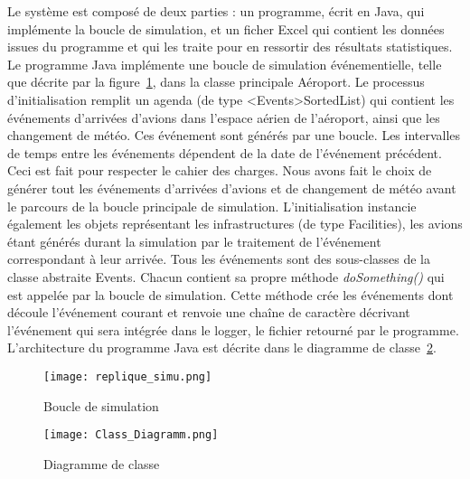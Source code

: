 


Le système est composé de deux parties : un programme, écrit en Java,  qui implémente la boucle de simulation, et un ficher Excel qui contient les données issues du programme et qui les traite pour en ressortir des résultats statistiques.
\\
Le programme Java implémente une boucle de simulation événementielle, telle que décrite par la figure~\ref{replique}, dans la classe principale Aéroport. 
Le processus d'initialisation remplit un agenda (de type <Events>SortedList) qui contient les événements d'arrivées d'avions dans l'espace aérien de l'aéroport, ainsi que les changement de météo. Ces événement sont générés par une boucle. 
Les intervalles de temps entre les événements dépendent de la date de l’événement précédent. Ceci est fait pour respecter le cahier des charges. 
Nous avons fait le choix de générer tout les événements d'arrivées d'avions et de changement de météo avant le parcours de la boucle principale de simulation. L'initialisation instancie également les objets représentant les infrastructures (de type Facilities), les avions étant générés durant la simulation par le traitement de l’événement correspondant à leur arrivée.
Tous les événements sont des sous-classes de la classe abstraite Events. Chacun contient sa propre méthode \textit{doSomething()} qui est appelée par la boucle de simulation. Cette méthode crée les événements dont découle l’événement courant et renvoie une chaîne de caractère décrivant l’événement qui sera intégrée dans le logger, le fichier retourné par le programme.
L'architecture du programme Java est décrite dans le diagramme de classe~\ref{class_diagramm}.
 \begin{figure}[h]
 \centering
 \texttt{[image: replique\_simu.png]}
   \caption{\label{replique} Boucle de simulation}
 \end{figure}
\clearpage

\begin{figure}[h!]
\hspace{-2cm}
 \texttt{[image: Class\_Diagramm.png]}
  \caption{\label{class_diagramm} Diagramme de classe} 
 \end{figure}
 
